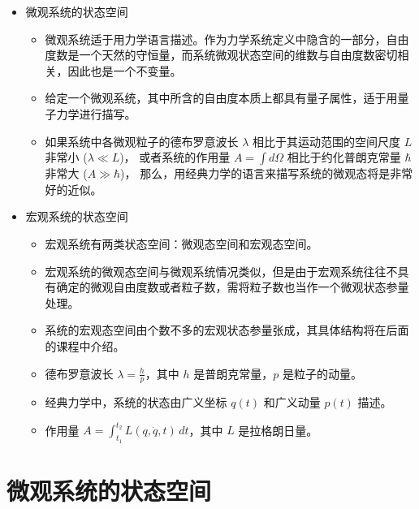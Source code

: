 \begin{defn}
    \noindent
    \begin{itemize}
        \item 微观系统的状态空间
    \begin{itemize}
        \item 微观系统适于用力学语言描述。作为力学系统定义中隐含的一部分，自由度数是一个天然的守恒量，而系统微观状态空间的维数与自由度数密切相关，因此也是一个不变量。
        \item 给定一个微观系统，其中所含的自由度本质上都具有量子属性，适于用量子力学进行描写。
        \item 如果系统中各微观粒子的德布罗意波长 \(\lambda\) 相比于其运动范围的空间尺度 \(L\) 非常小 (\(\lambda \ll L\))，
        或者系统的作用量 \(A = \int d\Omega\) 相比于约化普朗克常量 \(\hbar\) 非常大 (\(A \gg \hbar\))，
        那么，用经典力学的语言来描写系统的微观态将是非常好的近似。
    \end{itemize}
    \item 宏观系统的状态空间
    \begin{itemize}
        \item 宏观系统有两类状态空间：微观态空间和宏观态空间。
        \item 宏观系统的微观态空间与微观系统情况类似，但是由于宏观系统往往不具有确定的微观自由度数或者粒子数，需将粒子数也当作一个微观状态参量处理。
        \item 系统的宏观态空间由个数不多的宏观状态参量张成，其具体结构将在后面的课程中介绍。
    \end{itemize}
    \begin{zhu}
        \begin{itemize}
            \item 德布罗意波长 \(\lambda = \frac{h}{p}\)，其中 \(h\) 是普朗克常量，\(p\) 是粒子的动量。
            \item 经典力学中，系统的状态由广义坐标 \(q(t)\) 和广义动量 \(p(t)\) 描述。
            \item 作用量 \(A = \int_{t_1}^{t_2} L(q, \dot{q}, t) \, dt\)，其中 \(L\) 是拉格朗日量。
        \end{itemize}
    \end{zhu}
    \end{itemize}
\end{defn}
\section{微观系统的状态空间}











